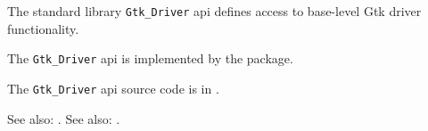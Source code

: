 
The standard library {\tt Gtk\_Driver} api defines access to base-level Gtk 
driver functionality.

The {\tt Gtk\_Driver} api is implemented by the  package.

The {\tt Gtk\_Driver} api source code is in .

See also:  .
See also:  .
